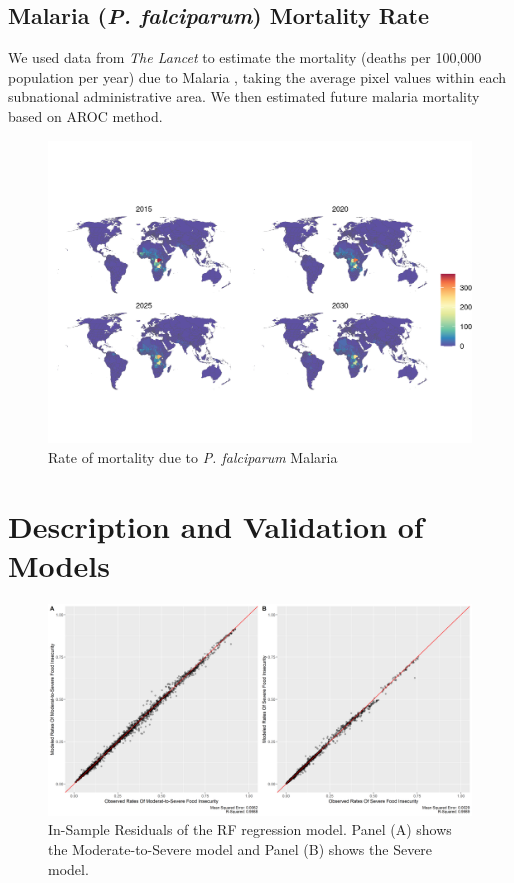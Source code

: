 \documentclass{article}
\begin{document}
\subsection{Malaria (\textit{P. falciparum}) Mortality Rate}
We used data from \textit{The Lancet} to estimate the mortality (deaths per 100,000 population per year) due to Malaria \citep{Weiss2019}, taking the average pixel values within each subnational administrative area.  We then estimated future malaria mortality based on AROC method.

\begin{figure}[H]
  \centering
  \includegraphics[width=\linewidth]{img/covars/mal_falciparum.png}
  \caption{Rate of mortality due to \textit{P. falciparum} Malaria}
\end{figure}

\section{Description and Validation of Models}


\begin{figure}[H]
  \centering
  \includegraphics[width=\linewidth]{img/model/residuals.png}
  \caption{In-Sample Residuals of the RF regression model. Panel (A) shows the Moderate-to-Severe model and Panel (B) shows the Severe model.}
\end{figure}
\end{document}
